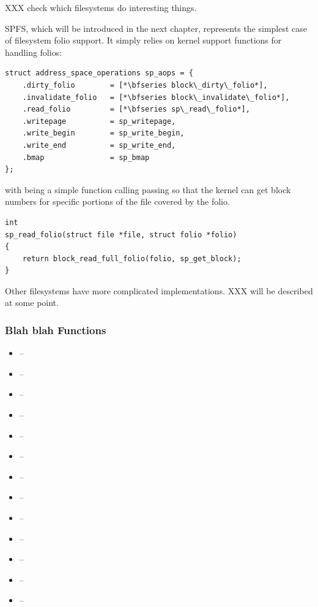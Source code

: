 \noindent
XXX check which filesystems do interesting things.

SPFS, which will be introduced in the next chapter, represents the simplest case of filesystem folio support. It simply relies on kernel support functions for handling folios:

\begin{lstlisting}
struct address_space_operations sp_aops = {
    .dirty_folio        = [*\bfseries block\_dirty\_folio*],
    .invalidate_folio   = [*\bfseries block\_invalidate\_folio*],
    .read_folio         = [*\bfseries sp\_read\_folio*],
    .writepage          = sp_writepage,
    .write_begin        = sp_write_begin,
    .write_end          = sp_write_end,
    .bmap               = sp_bmap
};
\end{lstlisting}

\noindent
with  being a simple function calling  passing  so that the kernel can get block numbers for specific portions of the file covered by the folio.

\begin{lstlisting}
int
sp_read_folio(struct file *file, struct folio *folio)
{
    return block_read_full_folio(folio, sp_get_block);
}
\end{lstlisting}

\noindent
Other filesystems have more complicated implementations. XXX will be described at some point.


\subsubsection{Blah blah Functions}

\begin{itemize}
    \item {} --
    \item {} --
    \item {} --
    \item {} --
    \item {} --
    \item {} --
    \item {} --
    \item {} --
    \item {} --
    \item {} --
    \item {} --
    \item {} --
    \item {} --
\end{itemize}

